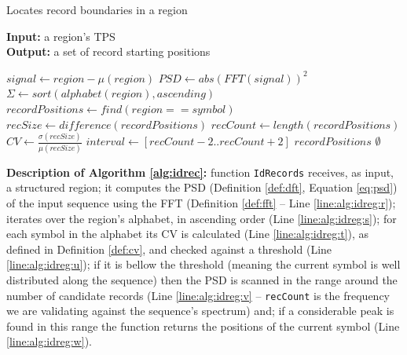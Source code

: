 \begin{small}
\begin{algorithm}
\caption{\small{Locates record boundaries in a region}}
\label{alg:idrec}
\begin{flushleft}
\textbf{Input:} a region's TPS \\
\textbf{Output:} a set of record starting positions
\end{flushleft}

\begin{algorithmic}[1]

\State $signal \leftarrow region-\mu(region)$ 
\State $PSD \leftarrow abs(FFT(signal))^2$\label{line:alg:idreg:r}
\State $\Sigma \leftarrow sort(alphabet(region), ascending)$
\label{line:alg:idreg:s}
\State $recordPositions \leftarrow find(region == symbol)$
\State $recSize \leftarrow difference(recordPositions)$
\State $recCount \leftarrow length(recordPositions)$
\State $CV \leftarrow
\frac{\sigma(recSize)}{\mu(recSize)}$\label{line:alg:idreg:t}
\label{line:alg:idreg:u}
\State $interval \leftarrow [recCount-2 .. recCount+2]$
\label{line:alg:idreg:v}
\State \Return $recordPositions$\label{line:alg:idreg:w}
\EndIf
\EndIf
\EndFor
\State \Return $\emptyset$
\EndFunction

\end{algorithmic}
\end{algorithm}
\end{small}

\vspace{-0.3cm}

\textbf{Description of Algorithm \ref{alg:idrec}:} function \texttt{IdRecords}
receives, as input, a structured region; it computes the PSD (Definition
\ref{def:dft}, Equation \ref{eq:psd}) of the input sequence using the FFT
(Definition \ref{def:fft} -- Line \ref{line:alg:idreg:r}); iterates over the
region's alphabet, in ascending order (Line \ref{line:alg:idreg:s}); for each
symbol in the alphabet its CV is calculated (Line \ref{line:alg:idreg:t}), as
defined in Definition \ref{def:cv}, and checked against a threshold (Line
\ref{line:alg:idreg:u}); if it is bellow the threshold (meaning the current
symbol is well distributed along the sequence) then the PSD is scanned in the
range around the number of candidate records (Line \ref{line:alg:idreg:v} --
\texttt{recCount} is the frequency we are validating against the sequence's
spectrum) and; if a considerable peak is found in this range the function
returns the positions of the current symbol (Line \ref{line:alg:idreg:w}).


